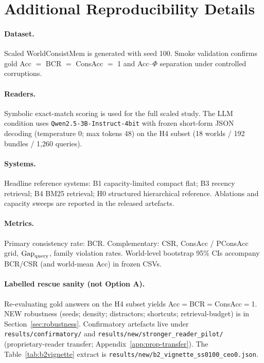 \section{Additional Reproducibility Details}
\label{app:repro}

\paragraph{Dataset.} Scaled WorldConsistMem is generated with seed 100. Smoke validation confirms gold Acc $=$ BCR $=$ ConsAcc $=$ 1 and Acc--$\Phi$ separation under controlled corruptions.

\paragraph{Readers.} Symbolic exact-match scoring is used for the full scaled study. The LLM condition uses \texttt{Qwen2.5-3B-Instruct-4bit} with frozen short-form JSON decoding (temperature 0; max tokens 48) on the H4 subset (18 worlds / 192 bundles / 1{,}260 queries).

\paragraph{Systems.} Headline reference systems: B1 capacity-limited compact flat; B3 recency retrieval; B4 BM25 retrieval; H0 structured hierarchical reference. Ablations and capacity sweeps are reported in the released artefacts.

\paragraph{Metrics.} Primary consistency rate: BCR. Complementary: CSR, ConsAcc / PConsAcc grid, $\mathrm{Gap}_{\mathrm{query}}$, family violation rates. World-level bootstrap 95\% CIs accompany BCR/CSR (and world-mean Acc) in frozen CSVs.

\paragraph{Labelled rescue sanity (not Option A).} Re-evaluating gold answers on the H4 subset yields Acc$=$BCR$=$ConsAcc$=$1. NEW robustness (seeds; density; distractors; shortcuts; retrieval-budget) is in Section~\ref{sec:robustness}. Confirmatory artefacts live under \texttt{results/confirmatory/} and \texttt{results/new/stronger\_reader\_pilot/} (proprietary-reader transfer; Appendix~\ref{app:prop-transfer}). The Table~\ref{tab:b2vignette} extract is \texttt{results/new/b2\_vignette\_ss0100\_ceo0.json}.

